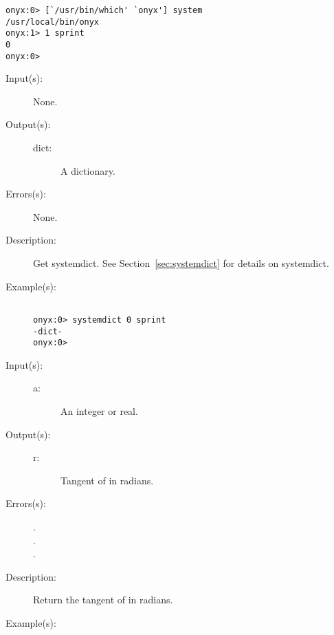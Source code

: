 \begin{description}
\begin{description}
\begin{verbatim}
onyx:0> [`/usr/bin/which' `onyx'] system
/usr/local/bin/onyx
onyx:1> 1 sprint
0
onyx:0>
		\end{verbatim}
	\end{description}
\label{systemdict:systemdict}
\item[{\onyxop{--}{systemdict}{dict}}: ]
	\begin{description}\item[]
	\item[Input(s): ] None.
	\item[Output(s): ]
		\begin{description}\item[]
		\item[dict: ]
			A dictionary.
		\end{description}
	\item[Errors(s): ] None.
	\item[Description: ]
		Get systemdict.  See Section~\ref{sec:systemdict} for details on
		systemdict.
	\item[Example(s): ]\begin{verbatim}

onyx:0> systemdict 0 sprint
-dict-
onyx:0>
		\end{verbatim}
	\end{description}
\label{systemdict:tan}
\item[{\onyxop{a}{sinh}{r}}: ]
	\begin{description}\item[]
	\item[Input(s): ]
		\begin{description}\item[]
		\item[a: ]
			An integer or real.
		\end{description}
	\item[Output(s): ]
		\begin{description}\item[]
		\item[r: ]
			Tangent of  in radians.
		\end{description}
	\item[Errors(s): ]
		\begin{description}\item[]
		\item[.]
		\item[.]
		\item[.]
		\end{description}
	\item[Description: ]
		Return the tangent of  in radians.
	\item[Example(s): ]\begin{verbatim}


\end{verbatim}
\end{description}
\end{description}
